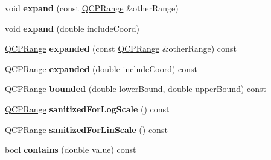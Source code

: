 \begin{DoxyCompactItemize}
\item 
void {\bfseries expand} (const \hyperlink{class_q_c_p_range}{Q\+C\+P\+Range} \&other\+Range)\hypertarget{class_q_c_p_range_a0fa1bc8048be50d52bea93a8caf08305}{}\label{class_q_c_p_range_a0fa1bc8048be50d52bea93a8caf08305}

\item 
void {\bfseries expand} (double include\+Coord)\hypertarget{class_q_c_p_range_a5fa977db0a4b7800075c629c62cf5e80}{}\label{class_q_c_p_range_a5fa977db0a4b7800075c629c62cf5e80}

\item 
\hyperlink{class_q_c_p_range}{Q\+C\+P\+Range} {\bfseries expanded} (const \hyperlink{class_q_c_p_range}{Q\+C\+P\+Range} \&other\+Range) const \hypertarget{class_q_c_p_range_a6437bdf29a7ebc2c88a6045c4e622384}{}\label{class_q_c_p_range_a6437bdf29a7ebc2c88a6045c4e622384}

\item 
\hyperlink{class_q_c_p_range}{Q\+C\+P\+Range} {\bfseries expanded} (double include\+Coord) const \hypertarget{class_q_c_p_range_a932046218e2b8b93b4be0a1d270b63c2}{}\label{class_q_c_p_range_a932046218e2b8b93b4be0a1d270b63c2}

\item 
\hyperlink{class_q_c_p_range}{Q\+C\+P\+Range} {\bfseries bounded} (double lower\+Bound, double upper\+Bound) const \hypertarget{class_q_c_p_range_a7ad9b4f4f53bd28c98b183d750abaddf}{}\label{class_q_c_p_range_a7ad9b4f4f53bd28c98b183d750abaddf}

\item 
\hyperlink{class_q_c_p_range}{Q\+C\+P\+Range} {\bfseries sanitized\+For\+Log\+Scale} () const \hypertarget{class_q_c_p_range_aaf6a9046e78d91eeb8e89584fe46b034}{}\label{class_q_c_p_range_aaf6a9046e78d91eeb8e89584fe46b034}

\item 
\hyperlink{class_q_c_p_range}{Q\+C\+P\+Range} {\bfseries sanitized\+For\+Lin\+Scale} () const \hypertarget{class_q_c_p_range_a1ff029704c29a75adbc1dc36cecaf44c}{}\label{class_q_c_p_range_a1ff029704c29a75adbc1dc36cecaf44c}

\item 
bool {\bfseries contains} (double value) const \hypertarget{class_q_c_p_range_a030ce95b527c32e01414d0351347b46d}{}\label{class_q_c_p_range_a030ce95b527c32e01414d0351347b46d}

\end{DoxyCompactItemize}
